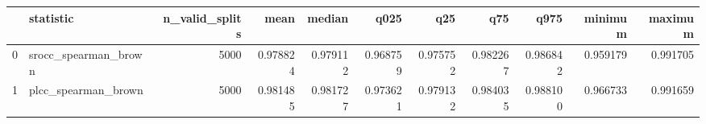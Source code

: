 \begin{tabular}{llrrrrrrrrr}
\toprule
 & statistic & n_valid_splits & mean & median & q025 & q25 & q75 & q975 & minimum & maximum \\
\midrule
0 & srocc_spearman_brown & 5000 & 0.978824 & 0.979112 & 0.968759 & 0.975752 & 0.982267 & 0.986842 & 0.959179 & 0.991705 \\
1 & plcc_spearman_brown & 5000 & 0.981485 & 0.981727 & 0.973621 & 0.979132 & 0.984035 & 0.988100 & 0.966733 & 0.991659 \\
\bottomrule
\end{tabular}
